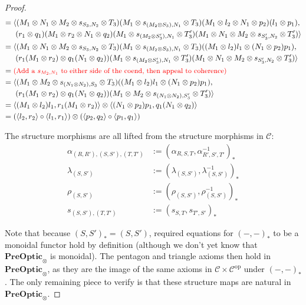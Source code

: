 \documentclass[11pt,a4paper]{article}
\theoremstyle{plain}
\theoremstyle{definition}
\newcommand{\C}{\mathscr{C}}
\newcommand{\PreOptic}{\mathbf{PreOptic}}
\newcommand{\op}{\mathrm{op}}
\newcommand{\todo}[1]{\textcolor{red}{\small #1}}
\begin{document}
\begin{proof}
\begin{align*}
= \; & \langle (M_1 \otimes N_1 \otimes M_2 \otimes s_{S_3,N_2} \otimes T_3)(M_1 \otimes s_{(M_2 \otimes S_3),N_1} \otimes T_3)(M_1 \otimes  l_2 \otimes N_1 \otimes p_2)(l_1 \otimes p_1), \\
&\;(r_1 \otimes q_1)(M_1 \otimes r_2 \otimes N_1 \otimes q_2)(M_1 \otimes s_{(M_2 \otimes S_3'),N_1} \otimes T_3')(M_1 \otimes N_1 \otimes M_2 \otimes s_{S_3',N_2} \otimes T_3') \rangle \\
= \; & \langle (M_1 \otimes N_1 \otimes M_2 \otimes s_{S_3,N_2} \otimes T_3)(M_1 \otimes s_{(M_2 \otimes S_3),N_1} \otimes T_3)((M_1 \otimes l_2)l_1\otimes (N_1 \otimes p_2)p_1), \\
&\;(r_1(M_1 \otimes r_2) \otimes q_1(N_1 \otimes q_2))(M_1 \otimes s_{(M_2 \otimes S_3'),N_1} \otimes T_3')(M_1 \otimes N_1 \otimes M_2 \otimes s_{S_3',N_2} \otimes T_3') \rangle \\
= \; & \text{\todo{(Add a $s_{M_2, N_1}$ to either side of the coend, then appeal to coherence)}} \\
= \; &\langle (M_1 \otimes M_2 \otimes s_{(N_1 \otimes N_2),S_3} \otimes T_3)((M_1 \otimes l_2)l_1\otimes (N_1 \otimes p_2)p_1) ,  \\
&\;(r_1(M_1 \otimes r_2) \otimes q_1(N_1 \otimes q_2))(M_1 \otimes M_2 \otimes s_{(N_1 \otimes N_2),S'_3} \otimes T'_3) \rangle \\
= \; &\langle (M_1 \otimes l_2)l_1, r_1(M_1 \otimes r_2) \rangle \otimes \langle (N_1 \otimes p_2)p_1, q_1(N_1 \otimes q_2) \rangle \\
= \; &(\langle l_2, r_2 \rangle  \circ \langle l_1, r_1 \rangle) \otimes (\langle p_2, q_2 \rangle \circ \langle p_1, q_1 \rangle)
\end{align*}

The structure morphisms are all lifted from the structure morphisms in $\C$:
\begin{align*}
\alpha_{(R, R'), (S, S'), (T, T')} &:= (\alpha_{R,S,T}, \alpha_{R',S',T'}^{-1})_* \\
\lambda_{(S, S')} &:= (\lambda_{(S, S')}, \lambda_{(S, S')}^{-1})_* \\
\rho_{(S, S')} &:= (\rho_{(S, S')}, \rho_{(S, S')}^{-1})_* \\
s_{(S, S'), (T, T')} &:= (s_{S, T}, s_{T', S'})_*
\end{align*}
 
Note that because $(S, S')_* = (S, S')$, required equations for $(-, -)_*$ to be a monoidal functor hold by definition (although we don't yet know that $\PreOptic_\otimes$ is monoidal). The pentagon and triangle axioms then hold in $\PreOptic_\otimes$, as they are the image of the same axioms in $\C \times \C^\op$ under $(-, -)_*$. The only remaining piece to verify is that these structure maps are natural in $\PreOptic_\otimes$. 


\end{proof}
\end{document}
